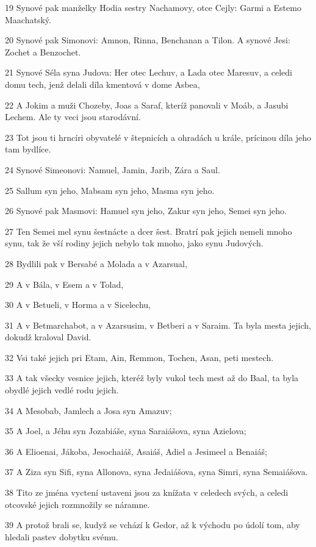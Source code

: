 \par 19 Synové pak manželky Hodia sestry Nachamovy, otce Cejly: Garmi a Estemo Maachatský.
\par 20 Synové pak Simonovi: Amnon, Rinna, Benchanan a Tilon. A synové Jesi: Zochet a Benzochet.
\par 21 Synové Séla syna Judova: Her otec Lechuv, a Lada otec Maresuv, a celedi domu tech, jenž delali díla kmentová v dome Asbea,
\par 22 A Jokim a muži Chozeby, Joas a Saraf, kteríž panovali v Moáb, a Jasubi Lechem. Ale ty veci jsou starodávní.
\par 23 Tot jsou ti hrncíri obyvatelé v štepnicích a ohradách u krále, prícinou díla jeho tam bydlíce.
\par 24 Synové Simeonovi: Namuel, Jamin, Jarib, Zára a Saul.
\par 25 Sallum syn jeho, Mabsam syn jeho, Masma syn jeho.
\par 26 Synové pak Masmovi: Hamuel syn jeho, Zakur syn jeho, Semei syn jeho.
\par 27 Ten Semei mel synu šestnácte a dcer šest. Bratrí pak jejich nemeli mnoho synu, tak že vší rodiny jejich nebylo tak mnoho, jako synu Judových.
\par 28 Bydlili pak v Bersabé a Molada a v Azarsual,
\par 29 A v Bála, v Esem a v Tolad,
\par 30 A v Betueli, v Horma a v Sicelechu,
\par 31 A v Betmarchabot, a v Azarsusim, v Betberi a v Saraim. Ta byla mesta jejich, dokudž kraloval David.
\par 32 Vsi také jejich pri Etam, Ain, Remmon, Tochen, Asan, peti mestech.
\par 33 A tak všecky vesnice jejich, kteréž byly vukol tech mest až do Baal, ta byla obydlé jejich vedlé rodu jejich.
\par 34 A Mesobab, Jamlech a Josa syn Amazuv;
\par 35 A Joel, a Jéhu syn Jozabiáše, syna Saraiášova, syna Azielova;
\par 36 A Elioenai, Jákoba, Jesochaiáš, Asaiáš, Adiel a Jesimeel a Benaiáš;
\par 37 A Ziza syn Sifi, syna Allonova, syna Jedaiášova, syna Simri, syna Semaiášova.
\par 38 Tito ze jména vyctení ustaveni jsou za knížata v celedech svých, a celedi otcovské jejich rozmnožily se náramne.
\par 39 A protož brali se, kudyž se vchází k Gedor, až k východu po údolí tom, aby hledali pastev dobytku svému.
